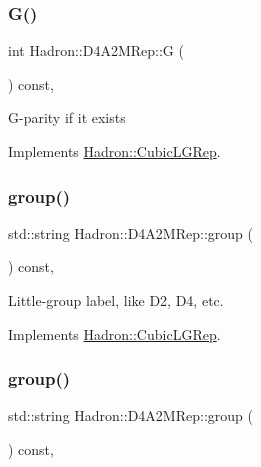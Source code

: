 \subsubsection{\texorpdfstring{G()}{G()}\hspace{0.1cm}{\footnotesize\ttfamily [2/2]}}
{\footnotesize\ttfamily int Hadron\+::\+D4\+A2\+M\+Rep\+::G (\begin{DoxyParamCaption}{ }\end{DoxyParamCaption}) const\hspace{0.3cm}{\ttfamily [inline]}, {\ttfamily [virtual]}}

G-\/parity if it exists 

Implements \mbox{\hyperlink{structHadron_1_1CubicLGRep_ace26f7b2d55e3a668a14cb9026da5231}{Hadron\+::\+Cubic\+L\+G\+Rep}}.

\mbox{\label{structHadron_1_1D4A2MRep_aa38e3e3ecd9017b530bc7b9a89197255}} 
\subsubsection{\texorpdfstring{group()}{group()}\hspace{0.1cm}{\footnotesize\ttfamily [1/2]}}
{\footnotesize\ttfamily std\+::string Hadron\+::\+D4\+A2\+M\+Rep\+::group (\begin{DoxyParamCaption}{ }\end{DoxyParamCaption}) const\hspace{0.3cm}{\ttfamily [inline]}, {\ttfamily [virtual]}}

Little-\/group label, like D2, D4, etc. 

Implements \mbox{\hyperlink{structHadron_1_1CubicLGRep_a9bdb14b519a611d21379ed96a3a9eb41}{Hadron\+::\+Cubic\+L\+G\+Rep}}.

\mbox{\label{structHadron_1_1D4A2MRep_aa38e3e3ecd9017b530bc7b9a89197255}} 
\subsubsection{\texorpdfstring{group()}{group()}\hspace{0.1cm}{\footnotesize\ttfamily [2/2]}}
{\footnotesize\ttfamily std\+::string Hadron\+::\+D4\+A2\+M\+Rep\+::group (\begin{DoxyParamCaption}{ }\end{DoxyParamCaption}) const\hspace{0.3cm}{\ttfamily [inline]}, {\ttfamily [virtual]}}

